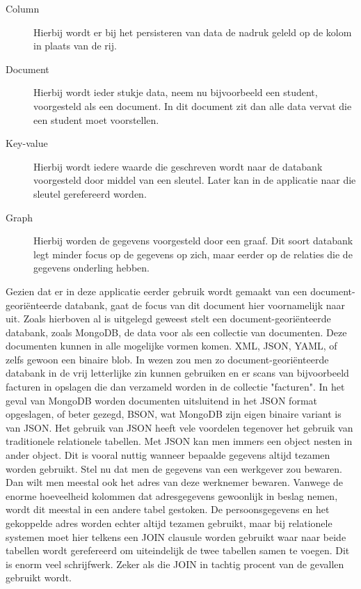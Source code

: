 \documentclass[a4paper,11pt]{article}
\begin{document}
\begin{description}

\item[Column] Hierbij wordt er bij het persisteren van data de nadruk geleld op de kolom in plaats van de rij. %
\item[Document] Hierbij wordt ieder stukje data, neem nu bijvoorbeeld 
een student, voorgesteld als een document. In dit document zit dan alle 
data vervat die een student moet voorstellen.
\item[Key-value] Hierbij wordt iedere waarde die geschreven wordt naar de databank voorgesteld door middel van een sleutel. Later kan in de applicatie naar die sleutel gerefereerd worden.
\item[Graph] Hierbij worden de gegevens voorgesteld door een graaf. Dit soort databank legt minder focus op de gegevens op zich, maar eerder op de relaties die de gegevens onderling hebben. %
\end{description}

Gezien dat er in deze applicatie eerder gebruik wordt gemaakt van een document-georiënteerde databank, gaat de focus van dit document hier voornamelijk naar uit. Zoals hierboven al is uitgelegd geweest stelt een document-georiënteerde databank, zoals MongoDB, de data voor als een collectie van documenten. Deze documenten kunnen in alle mogelijke vormen komen. XML, JSON, YAML, of zelfs gewoon een binaire blob. In wezen zou men zo document-georiënteerde databank in de vrij letterlijke zin kunnen gebruiken en er scans van bijvoorbeeld facturen in opslagen die dan verzameld worden in de collectie "facturen". In het geval van MongoDB worden documenten uitsluitend in het JSON format opgeslagen, of beter gezegd, BSON, wat MongoDB zijn eigen binaire variant is van JSON. Het gebruik van JSON heeft vele voordelen tegenover het gebruik van traditionele relationele tabellen.  Met JSON kan men immers een object nesten in ander object. Dit is vooral nuttig wanneer bepaalde gegevens altijd tezamen worden gebruikt. Stel nu dat men de gegevens van een werkgever zou bewaren. Dan wilt men meestal ook het adres van deze werknemer bewaren. Vanwege de enorme hoeveelheid kolommen dat adresgegevens gewoonlijk in beslag nemen, wordt dit meestal in een andere tabel gestoken. De persoonsgegevens en het gekoppelde adres worden echter altijd tezamen gebruikt, maar bij relationele systemen moet hier telkens een JOIN clausule worden gebruikt waar naar beide tabellen wordt gerefereerd om uiteindelijk de twee tabellen samen te voegen. Dit is enorm veel schrijfwerk. Zeker als die JOIN in tachtig procent van de gevallen gebruikt wordt.
\end{document}
